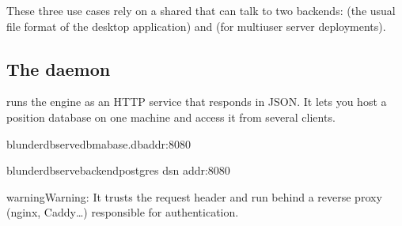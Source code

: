 \documentclass[letterpaper,10pt,english]{sphinxmanual}
\begin{document}
\sphinxAtStartPar
These three use cases rely on a shared  that can talk to two backends:  (the usual  file format of the desktop application) and  (for multi\sphinxhyphen{}user server deployments).


\subsection{The  daemon}
\label{\detokenize{mode_headless:le-demon-serve}}\label{\detokenize{mode_headless:headless-serve}}
\sphinxAtStartPar
{} runs the engine as an HTTP service that responds in JSON. It lets you host a position database on one machine and access it from several clients.

\begin{sphinxVerbatim}[commandchars=\\\{\}]
blunderdbserve\PYGZhy{}\PYGZhy{}dbma\PYGZus{}base.db\PYGZhy{}\PYGZhy{}addr:8080

blunderdbserve\PYGZhy{}\PYGZhy{}backendpostgres
\PYGZhy{}\PYGZhy{}dsn
\PYGZhy{}\PYGZhy{}addr:8080
\end{sphinxVerbatim}

\begin{sphinxadmonition}{warning}{Warning:}
\sphinxAtStartPar
{} It trusts the  request header and  run behind a reverse proxy (nginx, Caddy…) responsible for authentication. 
\end{sphinxadmonition}

\sphinxAtStartPar
{}
\end{document}
